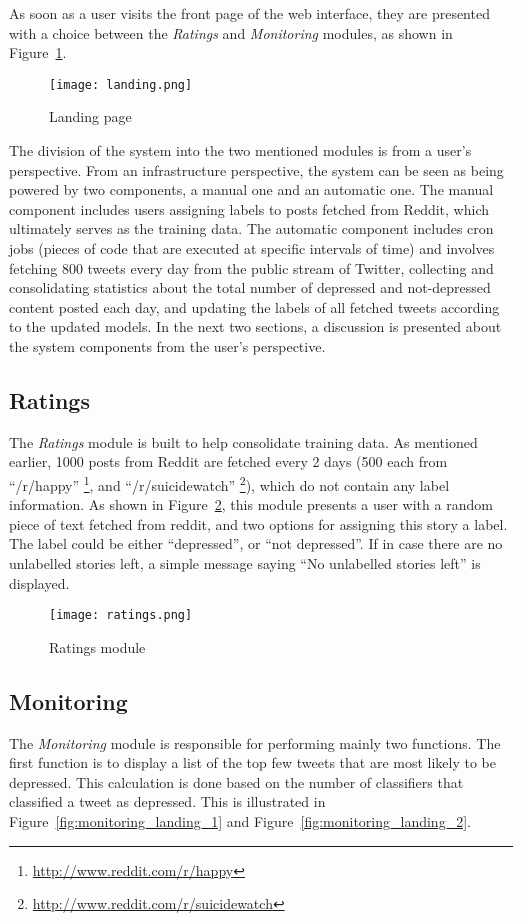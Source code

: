 As soon as a user visits the front page of the web interface, they are presented with a choice between the \emph{Ratings} and \emph{Monitoring} modules, as shown in Figure~\ref{fig:landing}.\\

\begin{figure}
    \centering
    \texttt{[image: landing.png]}
    \caption{Landing page}
    \label{fig:landing}
\end{figure}

The division of the system into the two mentioned modules is from a user's perspective. From an infrastructure perspective, the system can be seen as being powered by two components, a manual one and an automatic one. The manual component includes users assigning labels to posts fetched from Reddit, which ultimately serves as the training data. The automatic component includes cron jobs (pieces of code that are executed at specific intervals of time) and involves fetching 800 tweets every day from the public stream of Twitter, collecting and consolidating statistics about the total number of depressed and not-depressed content posted each day, and updating the labels of all fetched tweets according to the updated models. In the next two sections, a discussion is presented about the system components from the user's perspective.

\subsection{Ratings}
The \emph{Ratings} module is built to help consolidate training data. As mentioned earlier, 1000 posts from Reddit are fetched every 2 days (500 each from ``/r/happy'' \footnote{\url{http://www.reddit.com/r/happy}}, and ``/r/suicidewatch'' \footnote{\url{http://www.reddit.com/r/suicidewatch}}), which do not contain any label information. As shown in Figure~\ref{fig:ratings}, this module presents a user with a random piece of text fetched from reddit, and two options for assigning this story a label. The label could be either ``depressed'', or ``not depressed''. If in case there are no unlabelled stories left, a simple message saying ``No unlabelled stories left'' is displayed.

\begin{figure}
    \centering
    \texttt{[image: ratings.png]}
    \caption{Ratings module}
    \label{fig:ratings}
\end{figure}

\subsection{Monitoring}
The \emph{Monitoring} module is responsible for performing mainly two functions. The first function is to display a list of the top few tweets that are most likely to be depressed. This calculation is done based on the number of classifiers that classified a tweet as depressed. This is illustrated in Figure~\ref{fig:monitoring_landing_1} and Figure~\ref{fig:monitoring_landing_2}.\\

